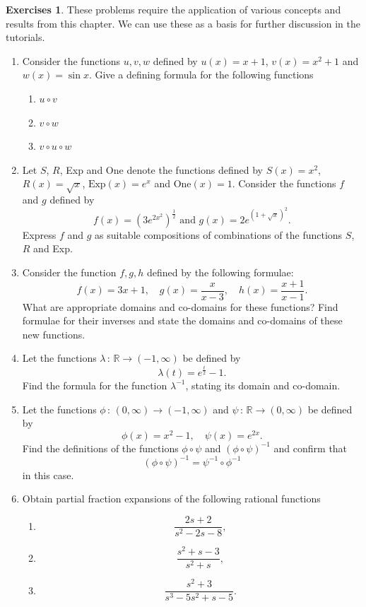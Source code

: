 \documentclass[extrafontsizes, twoside, a4paper]{memoir}
\theoremstyle{plain}%
\theoremstyle{definition}
\newtheorem{exer}{Exercises}[chapter]
\theoremstyle{remark}
\begin{document}
\begin{exer}
These problems require the application of various concepts and results from this chapter. We can use these as a basis for further discussion in the tutorials.
\begin{enumerate}
\item
 Consider the functions $u,v,w$ defined by $u(x)=x+1$, $v(x)=x^2 + 1$ and $w(x)=\sin{x}$. Give a defining formula for the following functions
\begin{enumerate}
\item
$u \circ v$
\item
$v \circ w$
\item
$v \circ u \circ w$
\end{enumerate}
\item
 Let $S$, $R$, Exp and One denote the functions defined by $S(x)=x^2$, $R(x)=\sqrt{x}$, $\text{Exp}(x)=e^x$ and $\text{One}(x)=1$. Consider the functions $f$ and $g$ defined by
$$f(x) = \left( 3 e^{2x^2} \right )^{\frac{1}{2}} \text{ and }
g(x) = 2e^{\left ( 1 + \sqrt{x} \right )^2}.$$
Express $f$ and $g$ as suitable compositions of combinations of the functions $S$, $R$ and Exp.

\item
 Consider the function $f, g, h$ defined by the following formulae:
$$f(x) = 3x +1 , \quad g(x) = \frac{x}{x-3} , \quad h(x)=\frac{x+1}{x-1} .$$
What are appropriate domains and co-domains for these functions? Find formulae for their inverses and state the domains and co-domains of these new functions.

\item
 Let the functions $\lambda \, : \, \mathbb{R} \to (-1, \infty)$ be defined by
$$ \lambda (t) = e^{\frac{t}{2}} - 1 .$$
Find the formula for the function $\lambda^{-1}$, stating its domain and co-domain.

\item
 Let the functions $\phi \, : \, (0, \infty) \to (-1, \infty) $ and $ \psi \, : \, \mathbb{R} \to (0, \infty)$ be defined by
$$ \phi(x) = x^2 - 1 , \quad \psi(x) = e^{2x} .$$
Find the definitions of the functions $\phi \circ \psi$ and $(\phi \circ \psi)^{-1}$ and confirm that
$$(\phi \circ \psi)^{-1} = \psi^{-1} \circ \phi^{-1}$$
in this case.
\item
Obtain partial fraction expansions of the following rational functions
\begin{enumerate}
\item
$$ \frac{2s+2}{s^2 - 2s -8} ,$$
\item
$$  \frac{s^2 + s-3}{s^2 + s} , $$
\item
$$ \frac{s^2+3}{s^3-5 s^2+s-5}.$$
\end{enumerate}
\end{enumerate}
\end{exer}
\end{document}
